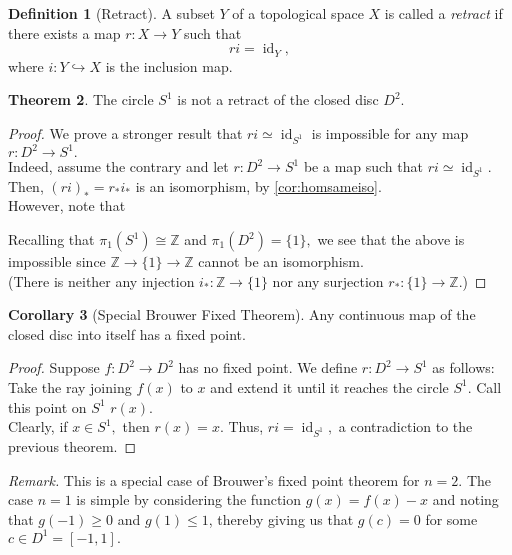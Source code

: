 \documentclass[12pt]{article}
\theoremstyle{definition}
\newtheorem{thm}{Theorem}
\numberwithin{thm}{section}
\newtheorem{defn}[thm]{Definition}
\newtheorem{cor}[thm]{Corollary}
\newcommand{\id}{\operatorname{id}}
\begin{document}
\begin{defn}[Retract]
	A subset $Y$ of a topological space $X$ is called a \emph{retract} if there exists a map $r:X \to Y$ such that
	\begin{equation*} 
		ri = \id_Y,
	\end{equation*}
	where $i:Y \hookrightarrow X$ is the inclusion map.
\end{defn}
\begin{thm}
	The circle $S^1$ is not a retract of the closed disc $D^2.$
\end{thm}
\begin{proof} 
	We prove a stronger result that $ri \simeq \id_{S^1}$ is impossible for any map $r:D^2 \to S^1.$\\
	Indeed, assume the contrary and let $r:D^2 \to S^1$ be a map such that $ri \simeq \id_{S^1}.$ Then, $(ri)_* = r_*i_*$ is an isomorphism, by \cref{cor:homsameiso}.\\
	However, note that 
	\begin{center}
	\end{center}
	Recalling that $\pi_1(S^1) \cong \mathbb{Z}$ and $\pi_1(D^2) = \{1\},$ we see that the above is impossible since $\mathbb{Z} \to \{1\} \to \mathbb{Z}$ cannot be an isomorphism. \\
	(There is neither any injection $i_* : \mathbb{Z} \to \{1\}$ nor any surjection $r_* : \{1\} \to \mathbb{Z}.$)
\end{proof}
\begin{cor}[Special Brouwer Fixed Theorem]
	Any continuous map of the closed disc into itself has a fixed point.
\end{cor}
\begin{proof} 
	Suppose $f:D^2 \to D^2$ has no fixed point. We define $r:D^2 \to S^1$ as follows:\\
	Take the ray joining $f(x)$ to $x$ and extend it until it reaches the circle $S^1.$ Call this point on $S^1$ $r(x).$\\
	Clearly, if $x \in S^1,$ then $r(x) = x.$ Thus, $ri = \id_{S^1},$ a contradiction to the previous theorem.
\end{proof}
\emph{Remark.} This is a special case of Brouwer's fixed point theorem for $n = 2.$ The case $n = 1$ is simple by considering the function $g(x) = f(x) - x$ and noting that $g(-1) \ge 0$ and $g(1) \le 1$, thereby giving us that $g(c) = 0$ for some $c \in D^1 = [-1, 1].$\\~\\
\end{document}
